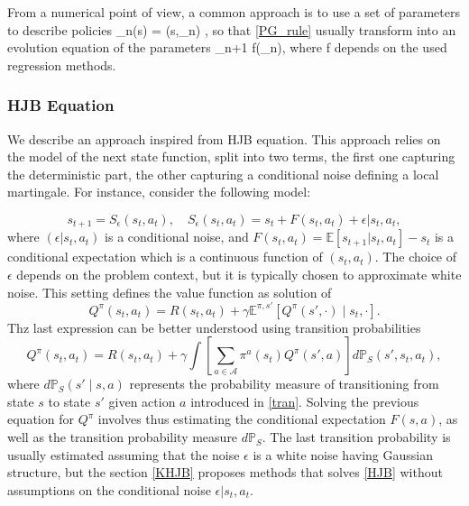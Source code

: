 \documentclass[
]{article}
\def\({}%
\def\){}%
\numberwithin{equation}{section}
\begin{document}
From a numerical point of view, a common approach is to use a set of parameters \( \theta \) to describe policies \( \pi_n(s) = \pi(s,\theta_n) \), so that \eqref{PG_rule} usually transform into an evolution equation of the parameters \( \theta_{n+1} \leftarrow f(\theta_n)\), where \( f \) depends on the used regression methods. 

\subsubsection{HJB Equation}\label{HJB}

We describe an approach inspired from HJB equation.
This approach relies on the model of the next state function, split into two terms, the first one capturing the deterministic part, the other capturing a conditional noise defining a local martingale. For instance, consider the following model:

\begin{equation}\label{HJBEq}
 s_{t+1} = S_\epsilon(s_t,a_t),\quad S_\epsilon(s_t,a_t)=s_t+F(s_t,a_t)+\epsilon | s_t,a_t,
\end{equation}
where $(\epsilon | s_t,a_t)$ is a conditional noise, and $F(s_t,a_t) = \mathbb{E}[s_{t+1} | s_t,a_t] - s_t$ is a conditional expectation which is a continuous function of $(s_t,a_t)$. The choice of $\epsilon$ depends on the problem context, but it is typically chosen to approximate white noise. This setting defines the value function as solution of
\begin{equation}
Q^{\pi}(s_t,a_t) = R(s_t,a_t) +  \gamma \mathbb{E}^{\pi,s'}\left[Q^{\pi}(s',\cdot) \mid s_t,\cdot\right].
\end{equation}
Thz last expression can be better understood using transition probabilities
\begin{equation}
Q^{\pi}(s_t,a_t) = R(s_t,a_t) +  \gamma   \int \left[ \sum_{a \in \mathcal{A}} \pi^a(s_t) Q^{\pi}(s',a)\right] d \mathbb{P}_S(s',s_t,a_t),
\end{equation}
where $ d \mathbb{P}_S(s' \mid s,a)$ represents the probability measure of transitioning from state $s$ to state $s'$ given action $a$ introduced in \eqref{tran}.
Solving the previous equation for $Q^\pi$ involves thus estimating the conditional expectation $F(s,a)$, as well as the transition probability measure $d \mathbb{P}_S$. The last transition probability is usually estimated assuming that the noise $\epsilon$ is a white noise having Gaussian structure, but the section \ref{KHJB} proposes methods that solves \eqref{HJB} without assumptions on the conditional noise $\epsilon | s_t,a_t$.
\end{document}
